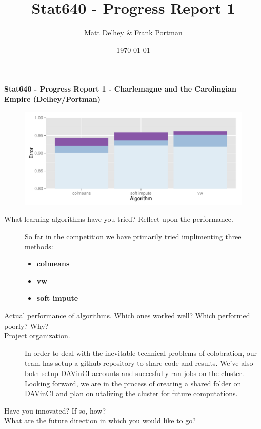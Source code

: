 \documentclass[oneside]{article}
\title{Stat640 - Progress Report 1}
\author{Matt Delhey \& Frank Portman}
\date{\today}
\begin{document}
\begin{center}
\textbf{Stat640 - Progress Report 1 - Charlemagne and the Carolingian Empire (Delhey/Portman)}
\end{center}

\begin{figure}[htbp]
  \includegraphics[width = 1.0\linewidth]{vis}
\end{figure}

\begin{description}
\item[What learning algorithms have you tried? Reflect upon the performance.] So far in the competition we have primarily tried implimenting three methods:
  \begin{itemize}
  \item \textbf{colmeans}
  \item \textbf{vw}
  \item \textbf{soft impute}
  \end{itemize}

\item[Actual performance of algorithms. Which ones worked well? Which performed poorly? Why?]

\item[Project organization.] In order to deal with the inevitable technical problems of colobration, our team has setup a github repository to share code and results. We've also both setup DAVinCI accounts and succesfully ran jobs on the cluster. Looking forward, we are in the process of creating a shared folder on DAVinCI and plan on utalizing the cluster for future computations.

\item[Have you innovated? If so, how?]

\item[What are the future direction in which you would like to go?]
\end{description}
\end{document}
